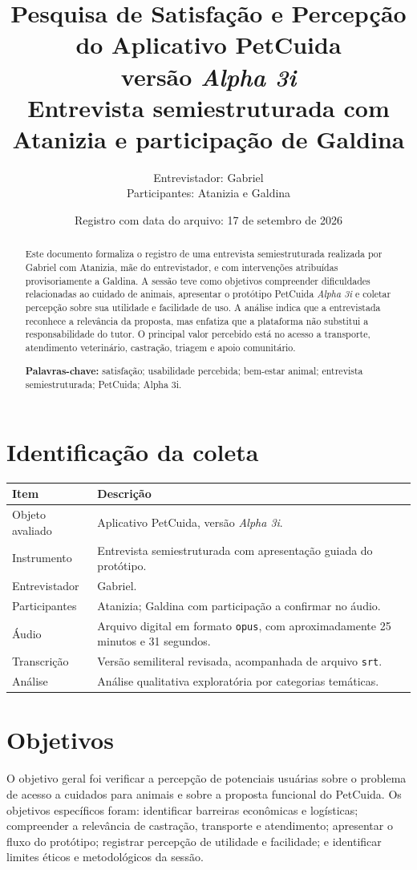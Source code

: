 \documentclass[12pt,a4paper]{article}
\title{\textbf{Pesquisa de Satisfação e Percepção do Aplicativo PetCuida\\ versão \textit{Alpha 3i}}\\[0.4cm]\large Entrevista semiestruturada com Atanizia e participação de Galdina}
\author{Entrevistador: Gabriel\\Participantes: Atanizia e Galdina}
\date{Registro com data do arquivo: 17 de setembro de 2026}
\begin{document}
\maketitle
\thispagestyle{empty}
\begin{abstract}
Este documento formaliza o registro de uma entrevista semiestruturada realizada por Gabriel com Atanizia, mãe do entrevistador, e com intervenções atribuídas provisoriamente a Galdina. A sessão teve como objetivos compreender dificuldades relacionadas ao cuidado de animais, apresentar o protótipo PetCuida \textit{Alpha 3i} e coletar percepção sobre sua utilidade e facilidade de uso. A análise indica que a entrevistada reconhece a relevância da proposta, mas enfatiza que a plataforma não substitui a responsabilidade do tutor. O principal valor percebido está no acesso a transporte, atendimento veterinário, castração, triagem e apoio comunitário.\par
\vspace{0.3cm}\noindent\textbf{Palavras-chave:} satisfação; usabilidade percebida; bem-estar animal; entrevista semiestruturada; PetCuida; Alpha 3i.
\end{abstract}
\newpage
\tableofcontents
\newpage
\section{Identificação da coleta}
\begin{longtable}{p{5cm}p{8.5cm}}\toprule\textbf{Item} & \textbf{Descrição}\\\midrule
Objeto avaliado & Aplicativo PetCuida, versão \textit{Alpha 3i}.\\
Instrumento & Entrevista semiestruturada com apresentação guiada do protótipo.\\
Entrevistador & Gabriel.\\
Participantes & Atanizia; Galdina com participação a confirmar no áudio.\\
Áudio & Arquivo digital em formato \texttt{opus}, com aproximadamente 25 minutos e 31 segundos.\\
Transcrição & Versão semiliteral revisada, acompanhada de arquivo \texttt{srt}.\\
Análise & Análise qualitativa exploratória por categorias temáticas.\\
\bottomrule\end{longtable}
\section{Objetivos}
O objetivo geral foi verificar a percepção de potenciais usuárias sobre o problema de acesso a cuidados para animais e sobre a proposta funcional do PetCuida. Os objetivos específicos foram: identificar barreiras econômicas e logísticas; compreender a relevância de castração, transporte e atendimento; apresentar o fluxo do protótipo; registrar percepção de utilidade e facilidade; e identificar limites éticos e metodológicos da sessão.
\end{document}

